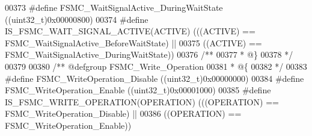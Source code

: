\begin{DoxyCode}
00373 \textcolor{preprocessor}{#}\textcolor{preprocessor}{define} \textcolor{preprocessor}{FSMC\_WaitSignalActive\_DuringWaitState}    \textcolor{preprocessor}{(}\textcolor{preprocessor}{(}\textcolor{preprocessor}{uint32\_t}\textcolor{preprocessor}{)}0x00000800\textcolor{preprocessor}{)}
00374 \textcolor{preprocessor}{#}\textcolor{preprocessor}{define} \textcolor{preprocessor}{IS\_FSMC\_WAIT\_SIGNAL\_ACTIVE}\textcolor{preprocessor}{(}\textcolor{preprocessor}{ACTIVE}\textcolor{preprocessor}{)} \textcolor{preprocessor}{(}\textcolor{preprocessor}{(}\textcolor{preprocessor}{(}\textcolor{preprocessor}{ACTIVE}\textcolor{preprocessor}{)} \textcolor{preprocessor}{==} 
      FSMC_WaitSignalActive_BeforeWaitState\textcolor{preprocessor}{)} \textcolor{preprocessor}{||}
00375                                             \textcolor{preprocessor}{(}\textcolor{preprocessor}{(}\textcolor{preprocessor}{ACTIVE}\textcolor{preprocessor}{)} \textcolor{preprocessor}{==} 
      FSMC_WaitSignalActive_DuringWaitState\textcolor{preprocessor}{)}\textcolor{preprocessor}{)}
00376 \textcolor{comment}{/**}
00377 \textcolor{comment}{  * @\}}
00378 \textcolor{comment}{  */}
00379 
00380 \textcolor{comment}{/** @defgroup FSMC\_Write\_Operation }
00381 \textcolor{comment}{  * @\{}
00382 \textcolor{comment}{  */}
00383 \textcolor{preprocessor}{#}\textcolor{preprocessor}{define} \textcolor{preprocessor}{FSMC\_WriteOperation\_Disable}                     \textcolor{preprocessor}{(}\textcolor{preprocessor}{(}\textcolor{preprocessor}{uint32\_t}\textcolor{preprocessor}{)}0x00000000\textcolor{preprocessor}{)}
00384 \textcolor{preprocessor}{#}\textcolor{preprocessor}{define} \textcolor{preprocessor}{FSMC\_WriteOperation\_Enable}                      \textcolor{preprocessor}{(}\textcolor{preprocessor}{(}\textcolor{preprocessor}{uint32\_t}\textcolor{preprocessor}{)}0x00001000\textcolor{preprocessor}{)}
00385 \textcolor{preprocessor}{#}\textcolor{preprocessor}{define} \textcolor{preprocessor}{IS\_FSMC\_WRITE\_OPERATION}\textcolor{preprocessor}{(}\textcolor{preprocessor}{OPERATION}\textcolor{preprocessor}{)} \textcolor{preprocessor}{(}\textcolor{preprocessor}{(}\textcolor{preprocessor}{(}\textcolor{preprocessor}{OPERATION}\textcolor{preprocessor}{)} \textcolor{preprocessor}{==} 
      FSMC_WriteOperation_Disable\textcolor{preprocessor}{)} \textcolor{preprocessor}{||}
00386                                             \textcolor{preprocessor}{(}\textcolor{preprocessor}{(}\textcolor{preprocessor}{OPERATION}\textcolor{preprocessor}{)} \textcolor{preprocessor}{==} 
      FSMC_WriteOperation_Enable\textcolor{preprocessor}{)}\textcolor{preprocessor}{)}

\end{DoxyCode}
